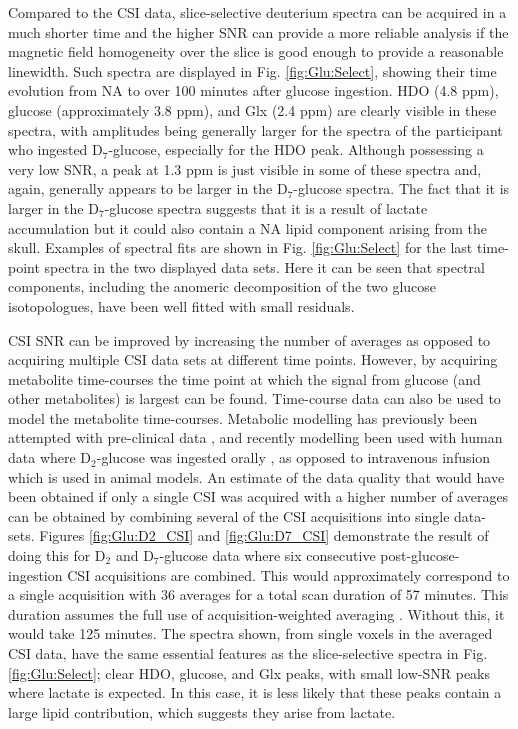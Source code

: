  Compared to the \ac{CSI} data, slice-selective deuterium spectra can be acquired in a much shorter time and the higher \ac{SNR} can provide a more reliable analysis if the magnetic field homogeneity over the slice is good enough to provide a reasonable linewidth. Such spectra are displayed in Fig. \ref{fig:Glu:Select}, showing their time evolution from \ac{NA} to over 100 minutes after glucose ingestion. HDO (4.8 ppm), glucose (approximately 3.8 ppm), and Glx (2.4 ppm) are clearly visible in these spectra, with amplitudes being generally larger for the spectra of the participant who ingested D$_7$-glucose, especially for the \ac{HDO} peak. Although possessing a very low \ac{SNR}, a peak at 1.3 ppm is just visible in some of these spectra and, again, generally appears to be larger in the D$_7$-glucose spectra. The fact that it is larger in the D$_7$-glucose spectra suggests that it is a result of lactate accumulation but it could also contain a \ac{NA} lipid component arising from the skull. Examples of spectral fits are shown in Fig. \ref{fig:Glu:Select} for the last time-point spectra in the two displayed data sets. Here it can be seen that spectral components, including the anomeric decomposition of the two glucose isotopologues, have been well fitted with small residuals.

\ac{CSI} \ac{SNR} can be improved by increasing the number of averages as opposed to acquiring multiple \ac{CSI} data sets at different time points. However, by acquiring metabolite time-courses the time point at which the signal from glucose (and other metabolites) is largest can be found. Time-course data can also be used to model the metabolite time-courses. Metabolic modelling has previously been attempted with pre-clinical data \cite{Lu2017QuantitativeSpectroscopy, Rich20201HVivo, Kreis2020MeasuringMRI, Simoes2022GlucoseGlioblastoma}, and recently modelling been used with human data where D$_2$-glucose was ingested orally \cite{Ruhm2022Dynamic9.4T}, as opposed to intravenous infusion which is used in animal models. An estimate of the data quality that would have been obtained if only a single \ac{CSI} was acquired with a higher number of averages can be obtained by combining several of the \ac{CSI} acquisitions into single data-sets. Figures \ref{fig:Glu:D2_CSI} and \ref{fig:Glu:D7_CSI} demonstrate the result of doing this for D$_2$ and D$_7$-glucose data where six consecutive post-glucose-ingestion \ac{CSI} acquisitions are combined. This would approximately correspond to a single acquisition with 36 averages for a total scan duration of 57 minutes. This duration assumes the full use of acquisition-weighted averaging \cite{Pohmann2001AccurateCSI}. Without this, it would take 125 minutes. The spectra shown, from single voxels in the averaged \ac{CSI} data, have the same essential features as the slice-selective spectra in Fig. \ref{fig:Glu:Select}; clear \ac{HDO}, glucose, and Glx peaks, with small low-\ac{SNR} peaks where lactate is expected. In this case, it is less likely that these peaks contain a large lipid contribution, which suggests they arise from lactate. 

